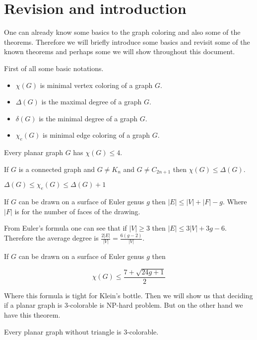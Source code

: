 \chapter{Revision and introduction}

One can already know some basics to the graph coloring and also some of the theorems. Therefore we will briefly introduce some basics and revisit some of the known theorems and perhaps some we will show throughout this document.

\begin{notation}
	First of all some basic notations.
	
	\begin{itemize}
		\item $\chi(G)$ is minimal vertex coloring of a graph $G$.
		\item $\Delta(G)$ is the maximal degree of a graph $G$.
		\item $\delta(G)$ is the minimal degree of a graph $G$.
		\item $\chi_e(G)$ is minimal edge coloring of a graph $G$.
	\end{itemize}
\end{notation}

\begin{thm}
	Every planar graph $G$ has $\chi (G) \leq 4$.
\end{thm}

\begin{thm}[Brooks]
	If $G$ is a connected graph and $G \neq K_n$ and $G \neq C_{2n+1}$ then $\chi(G) \leq \Delta(G)$.
\end{thm}

\begin{thm}[Vizing]
	$\Delta(G) \leq \chi_e(G) \leq \Delta(G) + 1$
\end{thm}

\begin{thm}
	If $G$ can be drawn on a surface of Euler genus $g$ then $|E| \leq |V| + |F| - g$. Where $|F|$ is for the number of faces of the drawing.
\end{thm}

From Euler's formula one can see that if $|V| \geq 3$ then $|E| \leq 3 |V| + 3g - 6$. Therefore the average degree is $\frac{2|E|}{|V|} = \frac{6(g-2)}{|V|}$.

\begin{thm}
	If $G$ can be drawn on a surface of Euler genus $g$ then
	
	$$
	\chi(G) \leq \frac{7 + \sqrt{24 g + 1}}{2}
	$$
\end{thm}

Where this formula is tight for Klein's bottle. Then we will show us that deciding if a planar graph is 3-colorable is NP-hard problem. But on the other hand we have this theorem.

\begin{thm}[Grötsch]
	Every planar graph without triangle is 3-colorable.
\end{thm}